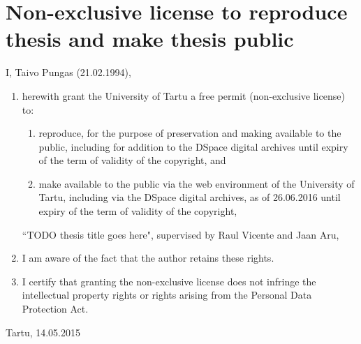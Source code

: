 \documentclass[a4paper,12pt]{report}
\theoremstyle{definition}
\begin{document}
%
%
\section*{Non-exclusive license to reproduce thesis and make thesis public}
I, Taivo Pungas (21.02.1994), 
\begin{enumerate}
	\item herewith grant the University of Tartu a free permit (non-exclusive license) to:
	\begin{enumerate}[label*=\arabic*.]
		\renewcommand{\theenumi}{\arabic{enumi}}
		\item reproduce, for the purpose of preservation and making available to the public, including for addition to the DSpace digital archives until expiry of the term of validity of the copyright, and
		\item make available to the public via the web environment of the University of Tartu, including via the DSpace digital archives, as of 26.06.2016 until expiry of the term of validity of the copyright,
	\end{enumerate}
	``TODO thesis title goes here", supervised by Raul Vicente and Jaan Aru,
	
	\item I am aware of the fact that the author retains these rights.

	\item I certify that granting the non-exclusive license does not infringe the intellectual property rights or rights arising from the Personal Data Protection Act. 
\end{enumerate}

Tartu, 14.05.2015

\thispagestyle{empty}
\newpage
\end{document}
